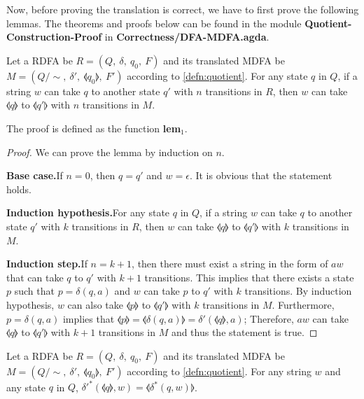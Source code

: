\par Now, before proving the translation is correct, we have to first prove
the following lemmas. The theorems and proofs below can be found in
the module \textbf{Quotient-Construction-Proof} in \textbf{Correctness/DFA-MDFA.agda}. 

\begin{lem}
\label{lem:rdfa<mdfa}
\noindent Let a RDFA be \(R = (Q,\ \delta,\ q_0,\ F)\) and its
translated MDFA be \(M = (Q/\!\sim,\ \delta',\ \llangle q_0 \rrangle,\
F')\) according to \autoref{defn:quotient}. For any state \(q\) in \(Q\), if a string \(w\) can take \(q\) to another state \(q'\) with \(n\) transitions
in \(R\), then \(w\) can take \(\llangle q \rrangle\) to \(\llangle q'
\rrangle\) with \(n\) transitions in \(M\). 
\end{lem}

\par The proof is defined as the function \textbf{lem\(_1\)}. 

\begin{proof}
\noindent We can prove the lemma by induction on \(n\).
\par \noindent \textbf{Base case.}\quad If \(n = 0\), then \(q = q'\)
and \(w = \epsilon\). It is obvious that the statement holds.

\par \noindent \textbf{Induction hypothesis.}\quad For any state \(q\)
in \(Q\), if a string \(w\) can take \(q\) to another state \(q'\)
with \(k\)  transitions
in \(R\), then \(w\) can take \(\llangle q \rrangle\) to \(\llangle q'
\rrangle\) with \(k\) transitions in \(M\). 

\par \noindent \textbf{Induction step.}\quad If \(n = k + 1\), then
there must exist a string in the form of \(aw\) that can take \(q\)
to \(q'\) with \(k + 1\) transitions. This implies that there exists a
state \(p\) such that \(p = \delta(q,a)\) and \(w\) can take \(p\) to \(q'\) with \(k\) transitions. By
induction hypothesis, \(w\) can also take \(\llangle p \rrangle\) to \(\llangle q'
\rrangle\) with \(k\) transitions in \(M\). Furthermore, \(p =
\delta(q,a)\) implies that \(\llangle p \rrangle = \llangle
\delta(q,a) \rrangle = \delta'(\llangle q \rrangle,a)\); Therefore, \(aw\)
can take \(\llangle q \rrangle\) to \(\llangle q' \rrangle\) with \(k
+ 1\) transitions in \(M\) and thus the statement is true. 
\end{proof}

\begin{lem}
\label{lem:rdfa>mdfa}
\noindent Let a RDFA be \(R = (Q,\ \delta,\ q_0,\ F)\) and its
translated MDFA be \(M = (Q/\!\sim,\ \delta',\ \llangle q_0 \rrangle,\
F')\) according to \autoref{defn:quotient}. For any string \(w\) and
any state \(q\) in \(Q\), \(\delta'^*(\llangle q \rrangle,w) = \llangle \delta^*(q,w) \rrangle\). 
\end{lem}

